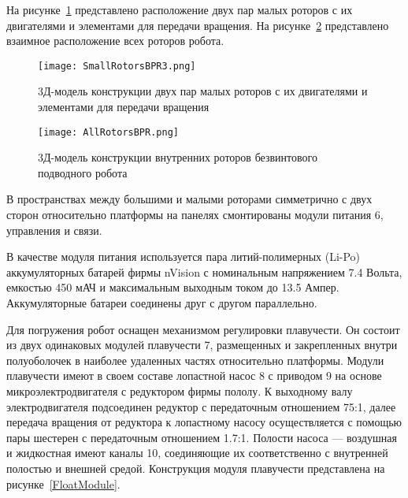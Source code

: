 На рисунке~\ref{SmallRotorsBPR3} представлено расположение двух пар малых роторов с их двигателями и элементами для передачи вращения. На рисунке~\ref{AllRotorsBPR} представлено взаимное расположение всех роторов робота.

\begin{figure}[h]
	\centering
	\texttt{[image: SmallRotorsBPR3.png]}%
	\caption{3Д-модель конструкции двух пар малых роторов с их двигателями и элементами для передачи вращения}
	\label{SmallRotorsBPR3}
\end{figure}

\begin{figure}[h]
	\centering
	\texttt{[image: AllRotorsBPR.png]}%
	\caption{3Д-модель конструкции внутренних роторов безвинтового подводного робота}
	\label{AllRotorsBPR}
\end{figure}



В пространствах между большими и малыми роторами симметрично с двух сторон относительно платформы на панелях смонтированы модули питания 6, управления и связи.

В качестве модуля питания используется пара литий-полимерных (Li-Po) аккумуляторных батарей фирмы nVision %
с номинальным напряжением 7.4 Вольта, емкостью 450 мАЧ и максимальным выходным током до 13.5 Ампер. Аккумуляторные батареи соединены друг с другом параллельно.


Для погружения робот оснащен механизмом регулировки плавучести. Он состоит из двух одинаковых модулей плавучести 7, размещенных и закрепленных внутри полуоболочек в наиболее удаленных частях относительно платформы. Модули плавучести имеют в своем составе лопастной насос 8 с приводом 9 на основе микроэлектродвигателя с редуктором фирмы пололу. К выходному валу электродвигателя подсоединен редуктор с передаточным отношением 75:1, далее передача вращения от редуктора к лопастному насосу осуществляется с помощью пары шестерен с передаточным отношением 1.7:1. Полости насоса --- воздушная и жидкостная имеют каналы 10, соединяющие их соответственно с внутренней полостью и внешней средой. Конструкция модуля плавучести представлена на рисунке~\ref{FloatModule}.

